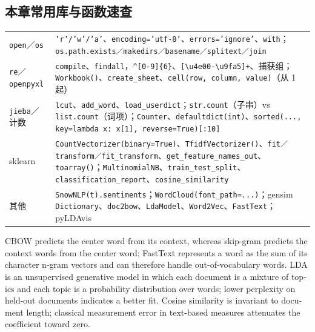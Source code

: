 \subsection{本章常用库与函数速查}
\begin{center}\small
\begin{tabularx}{\linewidth}{@{}p{2.4cm}L@{}}
\toprule
\texttt{open}／\texttt{os} & \texttt{'r'/'w'/'a'}、\texttt{encoding='utf-8'}、\texttt{errors='ignore'}、\texttt{with}；\texttt{os.path.exists／makedirs／basename／splitext／join} \\
\texttt{re}／\texttt{openpyxl} & \texttt{compile}、\texttt{findall}，\texttt{\^{}[0-9]\{6\}}、\texttt{[\textbackslash u4e00-\textbackslash u9fa5]+}、捕获组；\texttt{Workbook()}、\texttt{create\_sheet}、\texttt{cell(row, column, value)}（从 1 起）\\
\texttt{jieba}／计数 & \texttt{lcut}、\texttt{add\_word}、\texttt{load\_userdict}；\texttt{str.count}（子串）vs \texttt{list.count}（词项）；\texttt{Counter}、\texttt{defaultdict(int)}、\texttt{sorted(..., key=lambda x: x[1], reverse=True)[:10]} \\
sklearn & \texttt{CountVectorizer(binary=True)}、\texttt{TfidfVectorizer()}、\texttt{fit／transform／fit\_transform}、\texttt{get\_feature\_names\_out}、\texttt{toarray()}；\texttt{MultinomialNB}、\texttt{train\_test\_split}、\texttt{classification\_report}、\texttt{cosine\_similarity} \\
其他 & \texttt{SnowNLP(t).sentiments}；\texttt{WordCloud(font\_path=...)}；gensim \texttt{Dictionary}、\texttt{doc2bow}、\texttt{LdaModel}、\texttt{Word2Vec}、\texttt{FastText}；pyLDAvis \\
\bottomrule
\end{tabularx}
\end{center}
\begin{english}
\small CBOW predicts the center word from its context, whereas skip-gram predicts the context words from the center word; FastText represents a word as the sum of its character n-gram vectors and can therefore handle out-of-vocabulary words. LDA is an unsupervised generative model in which each document is a mixture of topics and each topic is a probability distribution over words; lower perplexity on held-out documents indicates a better fit. Cosine similarity is invariant to document length; classical measurement error in text-based measures attenuates the coefficient toward zero.
\end{english}

